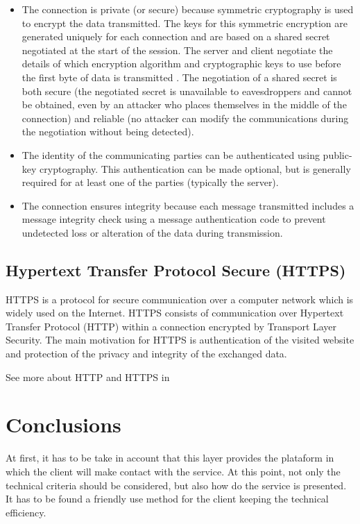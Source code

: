 \begin{itemize}
\item The connection is private (or secure) because symmetric cryptography is used to encrypt the data transmitted. The keys for this symmetric encryption are generated uniquely for each connection and are based on a shared secret negotiated at the start of the session. The server and client negotiate the details of which encryption algorithm and cryptographic keys to use before the first byte of data is transmitted . The negotiation of a shared secret is both secure (the negotiated secret is unavailable to eavesdroppers and cannot be obtained, even by an attacker who places themselves in the middle of the connection) and reliable (no attacker can modify the communications during the negotiation without being detected).
\item The identity of the communicating parties can be authenticated using public-key cryptography. This authentication can be made optional, but is generally required for at least one of the parties (typically the server).
\item The connection ensures integrity because each message transmitted includes a message integrity check using a message authentication code to prevent undetected loss or alteration of the data during transmission.
\end{itemize}

\subsection{Hypertext Transfer Protocol Secure (HTTPS)}
HTTPS is a protocol for secure communication over a computer network which is widely used on the Internet. HTTPS consists of communication over Hypertext Transfer Protocol (HTTP) within a connection encrypted by Transport Layer Security. The main motivation for HTTPS is authentication of the visited website and protection of the privacy and integrity of the exchanged data.

See more about HTTP and HTTPS in \cite{HTTPS}

\section{Conclusions} 
At first, it has to be take in account that this layer provides the plataform in which the client will make contact with the service. At this point, not only the technical criteria should be considered, but also how do the service is presented. It has to be found a friendly use method for the client keeping the technical efficiency.

